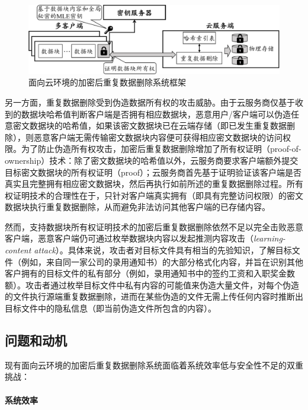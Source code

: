 \begin{figure}[!htb]
    \small
    \centering
    \includegraphics[width=\textwidth]{pic/Cloud-encrypted-deduplication-logic.pdf}
    \caption{面向云环境的加密后重复数据删除系统框架}
    \label{fig:Cloud-based-encrypted-deduplication-storage-logic}
\end{figure}

另一方面，重复数据删除受到伪造数据所有权的攻击威胁\cite{harnik10,mulazzani11}。由于云服务商仅基于收到的数据块哈希值判断客户端是否拥有相应数据块，恶意用户/客户端可以伪造任意密文数据块的哈希值，如果该密文数据块已在云端存储（即已发生重复数据删除），则恶意客户端无需传输密文数据块内容便可获得相应密文数据块的访问权限。为了防止伪造所有权攻击，加密后重复数据删除增加了所有权证明（proof-of-ownership）技术\cite{halevi11}：除了密文数据块的哈希值以外，云服务商要求客户端额外提交目标密文数据块的所有权证明（proof）；云服务商首先基于证明验证该客户端是否真实且完整拥有相应密文数据块，然后再执行如前所述的重复数据删除过程。所有权证明技术的合理性在于，只针对客户端真实拥有（即具有完整访问权限）的密文数据块执行重复数据删除，从而避免非法访问其他客户端的已存储内容。

然而，支持数据块所有权证明技术的加密后重复数据删除依然不足以完全击败恶意客户端，恶意客户端仍可通过枚举数据块内容以发起推测内容攻击（{\em learning-content attack}）\cite{harnik10, zuo18}。具体来说，攻击者对目标文件具有相当的先验知识，了解目标文件（例如，来自同一家公司的录用通知书）的大部分格式化内容，并旨在识别其他客户拥有的目标文件的私有部分（例如，录用通知书中的签约工资和入职奖金数额）。攻击者通过枚举目标文件中私有内容的可能值来伪造大量文件，对每个伪造的文件执行源端重复数据删除，进而在某些伪造的文件无需上传任何内容时推断出目标文件中的隐私信息（即当前伪造文件所包含的内容）。

\subsection{问题和动机}

现有面向云环境的加密后重复数据删除系统面临着系统效率低与安全性不足的双重挑战：

\paragraph{系统效率} 

